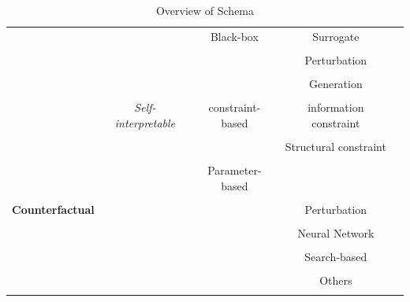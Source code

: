 \begin{table}[htbp]
\begin{tabular}{|l  |c |   c|   c | c  |}
       &      & Black-box    & Surrogate     &  \cite{graphlime} \cite{RELex} \cite{pgm-ex} \cite{distilexplain}         \\ %
          &     &     &     &         \\ \hline
       &      &      & Perturbation      & \cite{ying2019gnnexplainer} \cite{pgexplainer} \cite{Graph-mask} \cite{subgraphX}  \cite{PAGElink}      \\ %
          &     &     &    &         \\ \hline
       &      &      & Generation      & \cite{xgnn} \cite{RL-enhanced} \cite{Gen-causal} \cite{Gflow} \cite{gnninterpreter}        \\ %
          &     &     &    &         \\ \hline \hline 
     & \textit{Self-interpretable}    & constraint-based   & information constraint  & \cite{GIB} \cite{VGIB} \cite{GSAT}  \cite{inject-explain} \cite{GCI}  \\ %
                &     &    &   &       \\ \hline
     &    &    & Structural constraint  & \cite{SE-GNN}  \cite{D_invariant_rationale} \cite{protgnn} \cite{non-para-ex} \cite{structuralEx}  \\ %
                &     &    &   &       \\ \hline \hline 
     &   & Parameter-based   &   & \cite{GCAN} \cite{kergnns}     \\ %
                &     &    &   &       \\ \hline \hline \hline 
\textbf{Counterfactual}     &    &    & Perturbation  & \cite{cf^2} \cite{agnostic-counter}  \cite{cfgnnex} \cite{RC-ex} \cite{record-counter} \cite{meg-counter} \cite{MOO-counter} \cite{clear-counter} \cite{Global-counter}   \\ %
                &     &    &   &       \\ \hline    
     &    &    & Neural Network  & \cite{}     \\ %
                &     &    &   &       \\ \hline   
     &    &    & Search-based  & \cite{}     \\ %
                &     &    &   &       \\ \hline  
         &    &    & Others  & \cite{}     \\ %
                &     &    &   &      \\ \hline   
\end{tabular}
\caption{Overview of Schema }
\label{reg_mar_3_1_value}
\vspace{-5mm}
\end{table}

